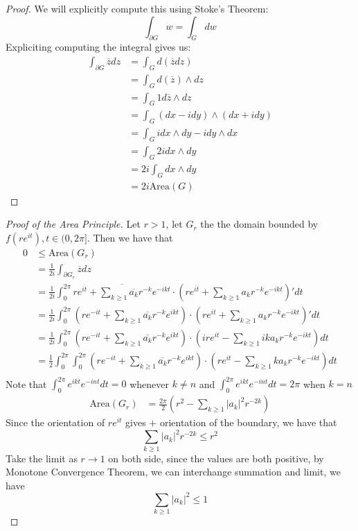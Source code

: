 \begin{proof}
    We will explicitly compute this using Stoke's Theorem:
    \[\int_{\partial G} w = \int_G dw\]
    Expliciting computing the integral gives us:
    \allowdisplaybreaks
    \begin{align*}
        \int_{\partial G} \overline{z} dz &= \int_G d(\overline{z} dz)\\
        &= \int_G d(\overline{z}) \wedge dz\\
        &= \int_{G} 1 d\overline{z} \wedge dz\\
        &= \int_G (dx - idy) \wedge (dx + idy)\\
        &= \int_G i dx \wedge dy - i dy \wedge dx\\
        &= \int_G 2i dx \wedge dy\\
        &= 2i \int_G dx \wedge dy\\
        &= 2i \text{Area}(G)
    \end{align*}
\end{proof}

\begin{proof}[Proof of the Area Principle]
    Let $r > 1$, let $G_r$ the the domain bounded by $f(re^{it}), t \in (0, 2\pi]$. Then we have that
    \begin{align*}
        0 &\leq \text{Area}(G_r)\\
        &= \frac{1}{2i} \int_{\partial G_r} \overline{z} dz\\
        &= \frac{1}{2i} \int_0^{2\pi} \overline{r e^{it} + \sum_{k \geq 1} \overline{a_k} r^{-k} e^{-ikt}} \cdot (r e^{it} + \sum_{k \geq 1} a_k r^{-k} e^{-ikt})' dt\\
        &=\frac{1}{2i} \int_0^{2\pi} (r e^{-it} + \sum_{k \geq 1} \overline{a_k} r^{-k} e^{ikt}) \cdot (r e^{it} + \sum_{k \geq 1} a_k r^{-k} e^{-ikt})' dt\\
        &= \frac{1}{2i} \int_0^{2\pi} (re^{-it} + \sum_{k\geq 1} \overline{a_k} r^{-k} e^{ikt}) \cdot (i r e^{it} - \sum_{k \geq 1} ik a_k r^{-k} e^{-ikt}) dt\\
        &= \frac{1}{2} \int_0^{2\pi} \int_0^{2\pi} (re^{-it} + \sum_{k\geq 1} \overline{a_k} r^{-k} e^{ikt}) \cdot (r e^{it} - \sum_{k \geq 1} k a_k r^{-k} e^{-ikt}) dt\\
    \end{align*}
    Note that $\int_0^{2\pi} e^{ikt} e^{-int} dt=0$ whenever $k \neq n$ and $\int_0^{2\pi} e^{ikt} e^{-int} dt= 2\pi$ when $k = n$
    \begin{align*}
        \text{Area}(G_r) &= \frac{2\pi}{2}(r^2 - \sum_{k \geq 1} |a_k|^2 r^{-2k})
    \end{align*}
    Since the orientation of $re^{it}$ gives $+$ orientation of the boundary, we have that
    \[\sum_{k\geq 1} |a_k|^2 r^{-2k} \leq r^2\]
    Take the limit as $r \to 1$ on both side, since the values are both positive, by Monotone Convergence Theorem, we can interchange summation and limit, we have
    \[\sum_{k \geq 1} |a_k|^2 \leq 1\]
\end{proof}

